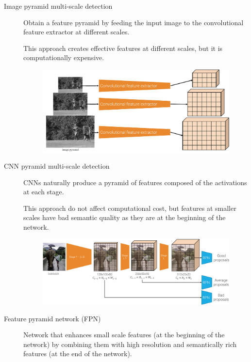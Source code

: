 \begin{description}
    \item[Image pyramid multi-scale detection] 
        Obtain a feature pyramid by feeding the input image to the convolutional feature extractor at different scales.

        \begin{remark}
            This approach creates effective features at different scales, but it is computationally expensive.
        \end{remark}

        \begin{figure}[H]
            \centering
            \includegraphics[width=0.6\linewidth]{./img/_image_pyramid_multi_scale.pdf}
        \end{figure}

    \item[CNN pyramid multi-scale detection] 
        CNNs naturally produce a pyramid of features composed of the activations at each stage.

        \begin{remark}
            This approach do not affect computational cost, but features at smaller scales have bad semantic quality as they are at the beginning of the network.
        \end{remark}

        \begin{figure}[H]
            \centering
            \includegraphics[width=0.8\linewidth]{./img/_cnn_pyramid_multi_scale.pdf}
        \end{figure}

    \item[Feature pyramid network (FPN)] 
        Network that enhances small scale features (at the beginning of the network) by combining them with high resolution and semantically rich features (at the end of the network).


\end{description}
